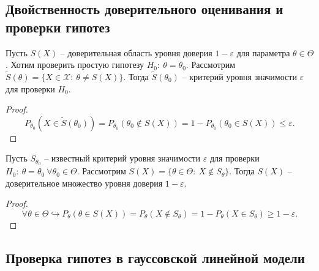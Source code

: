 \subsection{Двойственность доверительного оценивания и проверки гипотез}
\begin{proposition}
    Пусть $\displaystyle S( X)$ -- доверительная область уровня доверия $\displaystyle 1-\varepsilon $ для параметра $\displaystyle \theta \in \Theta $. Хотим проверить простую гипотезу $\displaystyle H_{0} :\ \theta =\theta _{0}$. Рассмотрим $\displaystyle \tilde{S}( \theta ) =\{X\in \mathcal{X} :\ \theta \neq S( X)\}$. Тогда $\displaystyle \tilde{S}( \theta _{0})$ -- критерий уровня значимости $\displaystyle \varepsilon $ для проверки $\displaystyle H_{0}$.
\end{proposition}
\begin{proof}
    \begin{equation*}
        P_{\theta _{0}}\left( X\in \tilde{S}( \theta _{0})\right) =P_{\theta _{0}}( \theta _{0} \notin S( X)) =1-P_{\theta _{0}}( \theta _{0} \in S( X)) \leqslant \varepsilon .
    \end{equation*}
\end{proof}
\begin{proposition}
    Пусть $\displaystyle S_{\theta _{0}}$ -- известный критерий уровня значимости $\displaystyle \varepsilon $ для проверки $\displaystyle H_{0} :\ \theta =\theta _{0} \ \forall \theta _{0} \in \Theta $. Рассмотрим $\displaystyle S( X) =\{\theta \in \Theta :\ X\notin S_{\theta }\}$. Тогда $\displaystyle S( X)$ -- доверительное множество уровня доверия $\displaystyle 1-\varepsilon $.
\end{proposition}
\begin{proof}
    \begin{equation*}
        \forall \theta \in \Theta \hookrightarrow P_{\theta }( \theta \in S( X)) =P_{\theta }( X\notin S_{\theta }) =1-P_{\theta }( X\in S_{\theta }) \geqslant 1-\varepsilon .
    \end{equation*}
\end{proof}
\subsection{Проверка гипотез в гауссовской линейной модели}

